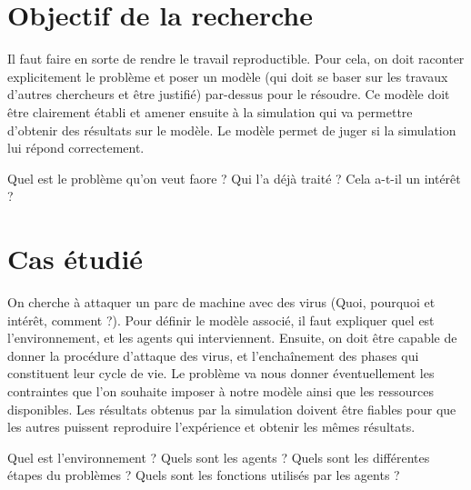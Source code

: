 \documentclass[francais, 10pt]{article}
\begin{document}
\section{Objectif de la recherche}
Il faut faire en sorte de rendre le travail reproductible. Pour cela, on doit raconter explicitement le problème et poser un modèle (qui doit se baser sur les travaux d'autres chercheurs et être justifié) par-dessus pour le résoudre. Ce modèle doit être clairement établi et amener ensuite à la simulation qui va permettre d'obtenir des résultats sur le modèle. Le modèle permet de juger si la simulation lui répond correctement.

Quel est le problème qu'on veut faore ? Qui l'a déjà traité ? Cela a-t-il un intérêt ?

\section{Cas étudié}
On cherche à attaquer un parc de machine avec des virus (Quoi, pourquoi et intérêt, comment ?).  Pour définir le modèle associé, il faut expliquer quel est l'environnement, et les agents qui interviennent. Ensuite, on doit être capable de donner la procédure d'attaque des virus, et l'enchaînement des phases qui constituent leur cycle de vie. Le problème va nous donner éventuellement les contraintes que l'on souhaite imposer à notre modèle ainsi que les ressources disponibles. Les résultats obtenus par la simulation doivent être fiables pour que les autres puissent reproduire l'expérience et obtenir les mêmes résultats. 

Quel est l'environnement ? Quels sont les agents ? Quels sont les différentes étapes du problèmes ? Quels sont les fonctions utilisés par les agents ? 
\end{document}
